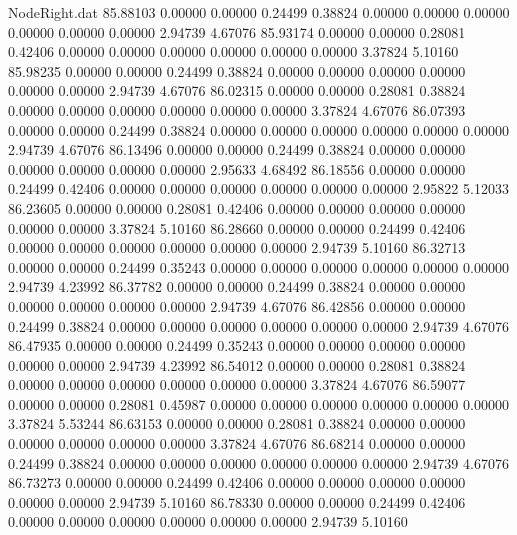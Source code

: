 \begin{filecontents}{NodeRight.dat}
  85.88103    0.00000    0.00000     0.24499    0.38824    0.00000    0.00000    0.00000    0.00000    0.00000    0.00000    2.94739    4.67076
  85.93174    0.00000    0.00000     0.28081    0.42406    0.00000    0.00000    0.00000    0.00000    0.00000    0.00000    3.37824    5.10160
  85.98235    0.00000    0.00000     0.24499    0.38824    0.00000    0.00000    0.00000    0.00000    0.00000    0.00000    2.94739    4.67076
  86.02315    0.00000    0.00000     0.28081    0.38824    0.00000    0.00000    0.00000    0.00000    0.00000    0.00000    3.37824    4.67076
  86.07393    0.00000    0.00000     0.24499    0.38824    0.00000    0.00000    0.00000    0.00000    0.00000    0.00000    2.94739    4.67076
  86.13496    0.00000    0.00000     0.24499    0.38824    0.00000    0.00000    0.00000    0.00000    0.00000    0.00000    2.95633    4.68492
  86.18556    0.00000    0.00000     0.24499    0.42406    0.00000    0.00000    0.00000    0.00000    0.00000    0.00000    2.95822    5.12033
  86.23605    0.00000    0.00000     0.28081    0.42406    0.00000    0.00000    0.00000    0.00000    0.00000    0.00000    3.37824    5.10160
  86.28660    0.00000    0.00000     0.24499    0.42406    0.00000    0.00000    0.00000    0.00000    0.00000    0.00000    2.94739    5.10160
  86.32713    0.00000    0.00000     0.24499    0.35243    0.00000    0.00000    0.00000    0.00000    0.00000    0.00000    2.94739    4.23992
  86.37782    0.00000    0.00000     0.24499    0.38824    0.00000    0.00000    0.00000    0.00000    0.00000    0.00000    2.94739    4.67076
  86.42856    0.00000    0.00000     0.24499    0.38824    0.00000    0.00000    0.00000    0.00000    0.00000    0.00000    2.94739    4.67076
  86.47935    0.00000    0.00000     0.24499    0.35243    0.00000    0.00000    0.00000    0.00000    0.00000    0.00000    2.94739    4.23992
  86.54012    0.00000    0.00000     0.28081    0.38824    0.00000    0.00000    0.00000    0.00000    0.00000    0.00000    3.37824    4.67076
  86.59077    0.00000    0.00000     0.28081    0.45987    0.00000    0.00000    0.00000    0.00000    0.00000    0.00000    3.37824    5.53244
  86.63153    0.00000    0.00000     0.28081    0.38824    0.00000    0.00000    0.00000    0.00000    0.00000    0.00000    3.37824    4.67076
  86.68214    0.00000    0.00000     0.24499    0.38824    0.00000    0.00000    0.00000    0.00000    0.00000    0.00000    2.94739    4.67076
  86.73273    0.00000    0.00000     0.24499    0.42406    0.00000    0.00000    0.00000    0.00000    0.00000    0.00000    2.94739    5.10160
  86.78330    0.00000    0.00000     0.24499    0.42406    0.00000    0.00000    0.00000    0.00000    0.00000    0.00000    2.94739    5.10160

\end{filecontents}
